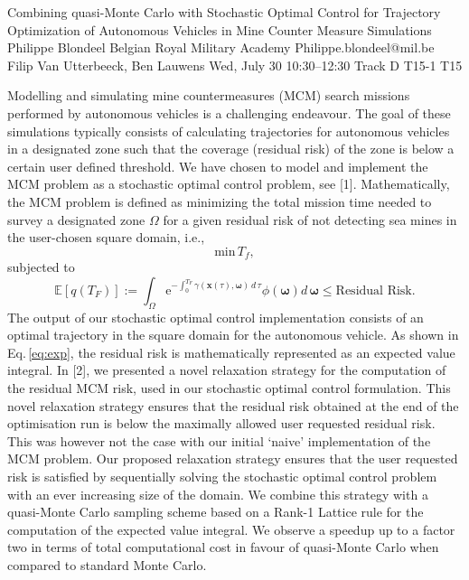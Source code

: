 \begin{talk}
  {Combining quasi-Monte Carlo with Stochastic Optimal Control for Trajectory Optimization of Autonomous Vehicles in Mine Counter Measure Simulations}%
  {Philippe Blondeel}%
  {Belgian Royal Military Academy}%
  {Philippe.blondeel@mil.be}%
  {Filip Van Utterbeeck, Ben Lauwens}%
  {}%
  {Wed, July 30 10:30–12:30 Track D}%
  {T15-1}%
  {T15}%
  
				
			
Modelling and simulating mine countermeasures (MCM) search missions performed by autonomous vehicles is a challenging endeavour. The goal of these simulations typically consists of calculating trajectories for autonomous vehicles in a designated zone such that the coverage (residual risk) of the zone is below a certain user defined threshold. We have chosen to model and implement the MCM problem as a stochastic optimal control problem, see [1]. Mathematically, the MCM problem is defined as minimizing the total mission time needed to survey a designated zone $\Omega$ for a given residual risk of not detecting sea mines in the  user-chosen square  domain, i.e., 
\begin{equation}
\text{min}\, T_f,
\label{eq:min}
\end{equation}
subjected to
\begin{equation}
 \mathbb{E}[q\left(T_F\right)] :=  \int_\Omega \text{e}^{-\int_0^{T_F} \gamma\left(\bm{x}\left(\tau\right),\bm{\omega}\right)\, d\,\tau}\phi\left(\bm{\omega}\right) d\,\bm{\omega} \leq \text{Residual Risk}.
\label{eq:exp}
\end{equation}
The output of our stochastic optimal control implementation consists of an optimal trajectory in the square domain for the autonomous vehicle.  As shown in Eq.\,\eqref{eq:exp}, the residual risk is mathematically represented as an expected value integral. In [2], we presented a novel relaxation strategy for the computation of the residual MCM risk, used in our stochastic optimal control formulation. This novel relaxation strategy ensures that the  residual risk obtained at the end of the optimisation run is below the maximally allowed user requested residual risk. This was however not the case  with our initial `naive' implementation of the MCM problem. Our proposed relaxation strategy ensures that the user requested risk is satisfied by sequentially solving the stochastic optimal control problem with an ever increasing size of the domain. We combine this strategy with  a quasi-Monte Carlo  sampling scheme based on a Rank-1 Lattice rule for the computation of the expected value integral. We observe a speedup up to a factor two in terms of total computational cost in favour of quasi-Monte Carlo when compared to standard Monte Carlo.



\end{talk}
